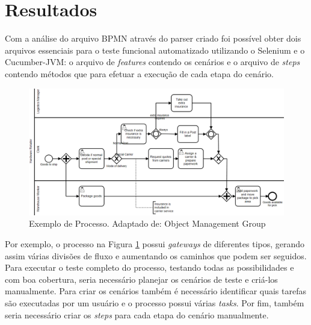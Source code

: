\documentclass[12pt]{article}
\begin{document}
\section{Resultados}
Com a análise do arquivo BPMN através do parser criado foi possível obter dois arquivos essenciais para o teste funcional automatizado utilizando o Selenium e o Cucumber-JVM: o arquivo de \emph{features} contendo os cenários e o arquivo de \emph{steps} contendo métodos que para efetuar a execução de cada etapa do cenário. 

\begin{figure}[ht]
\includegraphics[width=.8\paperwidth]{figuras/diagrama_exemplo.png}
\caption{Exemplo de Processo. Adaptado de: Object Management Group}
\label{fig:diagrama_exemplo}
\end{figure}

Por exemplo, o processo na Figura \ref{fig:diagrama_exemplo} possui \emph{gateways} de diferentes tipos, gerando assim várias divisões de fluxo e aumentando os caminhos que podem ser seguidos. Para executar o teste completo do processo, testando todas as possibilidades e com boa cobertura, seria necessário planejar os cenários de teste e criá-los manualmente. Para criar os cenários também é necessário identificar quais tarefas são executadas por um usuário e o processo possui várias \emph{tasks}. Por fim, também seria necessário criar os \emph{steps} para cada etapa do cenário manualmente.
\end{document}
